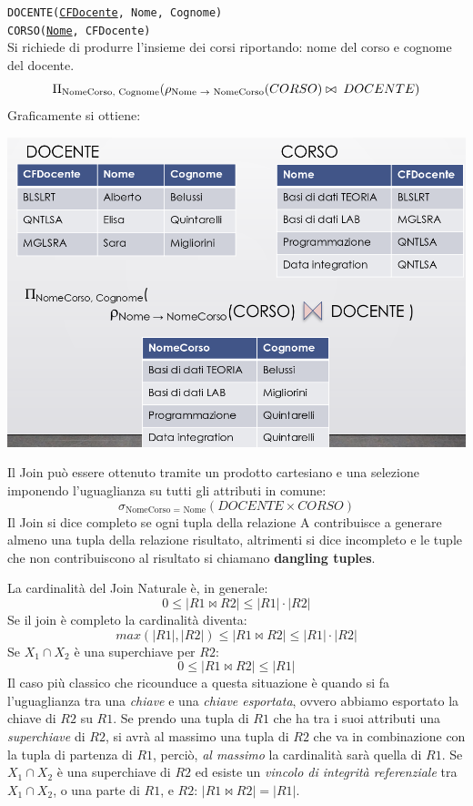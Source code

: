 \documentclass{report}
\begin{document}
\noindent\texttt{DOCENTE(\underline{CFDocente}, Nome, Cognome) \\
CORSO(\underline{Nome}, CFDocente)}\\

\noindent Si richiede di produrre l'insieme dei corsi riportando: nome del corso e cognome del docente.
\[ \Pi_{\text{NomeCorso, Cognome}}(\rho_{\text{Nome $\to$ NomeCorso}}(CORSO) \bowtie \thickspace DOCENTE)\]
Graficamente si ottiene:

\begin{center}
\includegraphics[scale=0.35]{join_example}
\end{center}


Il Join può essere ottenuto tramite un prodotto cartesiano e una selezione imponendo l’uguaglianza su tutti gli attributi in comune:\\

\[\sigma_{\text{NomeCorso = Nome}}(DOCENTE \times CORSO)\]
Il Join si dice completo se ogni tupla della relazione A contribuisce a generare almeno una tupla della relazione risultato, altrimenti si dice incompleto e le tuple che non contribuiscono al risultato si chiamano \textbf{dangling tuples}.

La cardinalità del Join Naturale è, in generale:
\[0 \leq |R1 \bowtie R2| \leq |R1| \cdot |R2|\]
Se il join \`e completo la cardinalit\`a diventa:
\[ max(|R1|, |R2|) \leq |R1 \bowtie R2| \leq |R1| \cdot |R2| \]
Se $X_1 \cap X_2$ \`e una superchiave per $R2$:
\[ 0 \le |R1 \bowtie R2| \leq |R1| \]
Il caso pi\`u classico che ricounduce a questa situazione \`e quando si fa l'uguaglianza tra una \emph{chiave} e una \emph{chiave esportata}, ovvero abbiamo esportato la chiave di $R2$ su $R1$. Se prendo una tupla di $R1$ che ha tra i suoi attributi una \emph{superchiave} di $R2$, si avr\`a al massimo una tupla di $R2$ che va in combinazione con la tupla di partenza di $R1$, perci\`o, \emph{al massimo} la cardinalit\`a sar\`a quella di $R1$. Se $X_1 \cap X_2$ \`e una superchiave di $R2$ ed esiste un \emph{vincolo di integrit\`a referenziale} tra $X_1 \cap X_2$, o una parte di $R1$, e $R2$: $|R1 \bowtie R2| = |R1|$.
\end{document}
